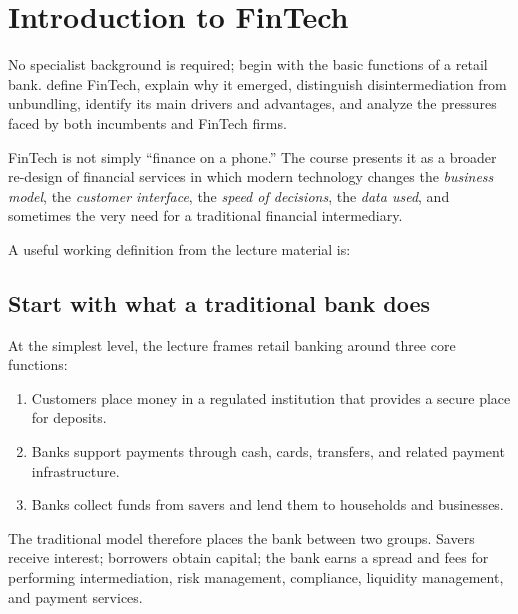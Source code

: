 \chapter{Introduction to FinTech}
\label{ch:intro-fintech}

\chapterguide%
  {No specialist background is required; begin with the basic functions of a retail bank.}
  {define FinTech, explain why it emerged, distinguish disintermediation from unbundling, identify its main drivers and advantages, and analyze the pressures faced by both incumbents and FinTech firms.}

FinTech is not simply ``finance on a phone.'' The course presents it as a broader re-design of financial services in which modern technology changes the \emph{business model}, the \emph{customer interface}, the \emph{speed of decisions}, the \emph{data used}, and sometimes the very need for a traditional financial intermediary.

\begin{keyidea}
A useful working definition from the lecture material is: 
\end{keyidea}

\section{Start with what a traditional bank does}

At the simplest level, the lecture frames retail banking around three core functions:

\begin{enumerate}
  \item {} Customers place money in a regulated institution that provides a secure place for deposits.
  \item {} Banks support payments through cash, cards, transfers, and related payment infrastructure.
  \item {} Banks collect funds from savers and lend them to households and businesses.
\end{enumerate}

The traditional model therefore places the bank between two groups. Savers receive interest; borrowers obtain capital; the bank earns a spread and fees for performing intermediation, risk management, compliance, liquidity management, and payment services.

